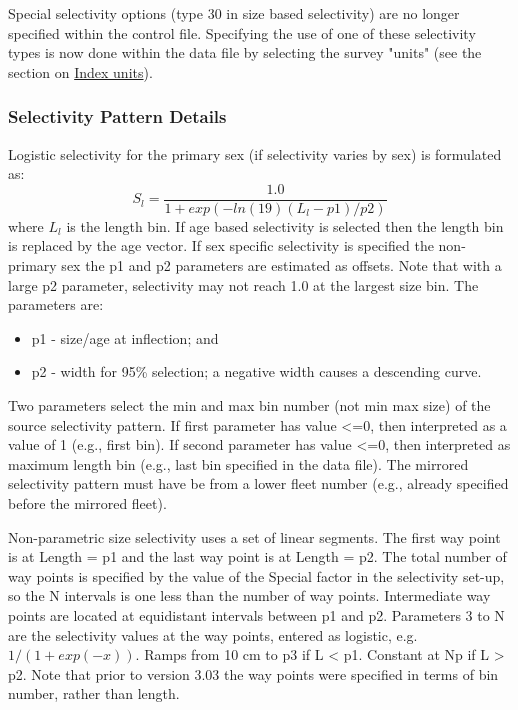 Special selectivity options (type 30 in size based selectivity) are no longer specified within the control file. Specifying the use of one of these selectivity types is now done within the data file by selecting the survey "units" (see the section on \hyperlink{IndexUnits}{Index units}).

\subsubsection{Selectivity Pattern Details}
Logistic selectivity for the primary sex (if selectivity varies by sex) is formulated as:
	\begin{equation}
	S_l = \frac{1.0}{1+exp(-ln(19)(L_l - p1)/p2)}
	\end{equation}
where $L_l$ is the length bin.  If age based selectivity is selected then the length bin is replaced by the age vector. If sex specific selectivity is specified the non-primary sex the p1 and p2 parameters are estimated as offsets.  Note that with a large p2 parameter, selectivity may not reach 1.0 at the largest size bin. The parameters are:
\begin{itemize}
	\item p1 - size/age at inflection; and
	\item p2 - width for 95\% selection; a negative width causes a descending curve.
\end{itemize}

Two parameters select the min and max bin number (not min max size) of the source selectivity pattern.  If first parameter has value <=0, then interpreted as a value of 1 (e.g., first bin). If second parameter has value <=0, then interpreted as maximum length bin (e.g., last bin specified in the data file). The mirrored selectivity pattern must have be from a lower fleet number (e.g., already specified before the mirrored fleet).


Non-parametric size selectivity uses a set of linear segments.  The first way point is at Length = p1 and the last way point is at Length = p2.  The total number of way points is specified by the value of the Special factor in the selectivity set-up, so the N intervals is one less than the number of way points. Intermediate way points are located at equidistant intervals between p1 and p2.  Parameters 3 to N are the selectivity values at the way points, entered as logistic, e.g. $1/(1+exp(-x))$.  Ramps from 10 cm to p3 if L < p1.  Constant at Np if L > p2.  Note that prior to version 3.03 the way points were specified in terms of bin number, rather than length.


